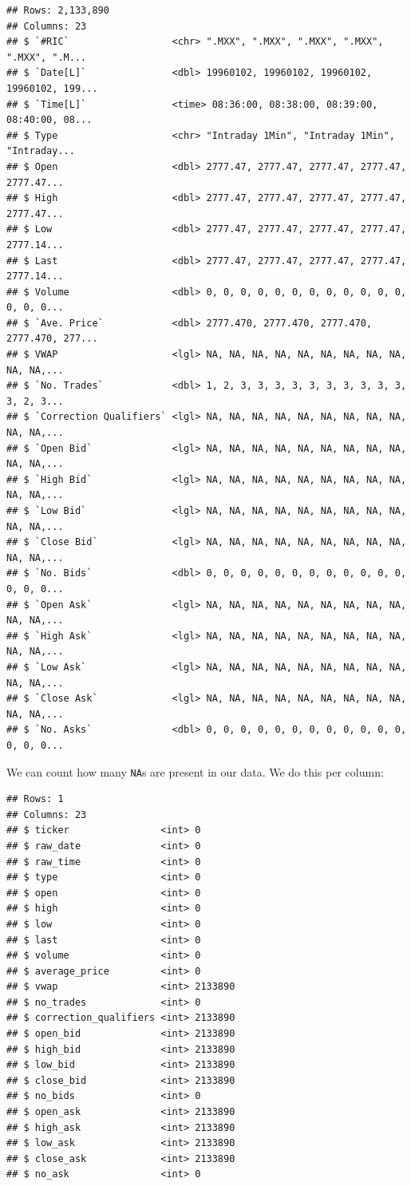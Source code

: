 \documentclass[]{elsarticle} %
\begin{document}
\begin{verbatim}
## Rows: 2,133,890
## Columns: 23
## $ `#RIC`                  <chr> ".MXX", ".MXX", ".MXX", ".MXX", ".MXX", ".M...
## $ `Date[L]`               <dbl> 19960102, 19960102, 19960102, 19960102, 199...
## $ `Time[L]`               <time> 08:36:00, 08:38:00, 08:39:00, 08:40:00, 08...
## $ Type                    <chr> "Intraday 1Min", "Intraday 1Min", "Intraday...
## $ Open                    <dbl> 2777.47, 2777.47, 2777.47, 2777.47, 2777.47...
## $ High                    <dbl> 2777.47, 2777.47, 2777.47, 2777.47, 2777.47...
## $ Low                     <dbl> 2777.47, 2777.47, 2777.47, 2777.47, 2777.14...
## $ Last                    <dbl> 2777.47, 2777.47, 2777.47, 2777.47, 2777.14...
## $ Volume                  <dbl> 0, 0, 0, 0, 0, 0, 0, 0, 0, 0, 0, 0, 0, 0, 0...
## $ `Ave. Price`            <dbl> 2777.470, 2777.470, 2777.470, 2777.470, 277...
## $ VWAP                    <lgl> NA, NA, NA, NA, NA, NA, NA, NA, NA, NA, NA,...
## $ `No. Trades`            <dbl> 1, 2, 3, 3, 3, 3, 3, 3, 3, 3, 3, 3, 3, 2, 3...
## $ `Correction Qualifiers` <lgl> NA, NA, NA, NA, NA, NA, NA, NA, NA, NA, NA,...
## $ `Open Bid`              <lgl> NA, NA, NA, NA, NA, NA, NA, NA, NA, NA, NA,...
## $ `High Bid`              <lgl> NA, NA, NA, NA, NA, NA, NA, NA, NA, NA, NA,...
## $ `Low Bid`               <lgl> NA, NA, NA, NA, NA, NA, NA, NA, NA, NA, NA,...
## $ `Close Bid`             <lgl> NA, NA, NA, NA, NA, NA, NA, NA, NA, NA, NA,...
## $ `No. Bids`              <dbl> 0, 0, 0, 0, 0, 0, 0, 0, 0, 0, 0, 0, 0, 0, 0...
## $ `Open Ask`              <lgl> NA, NA, NA, NA, NA, NA, NA, NA, NA, NA, NA,...
## $ `High Ask`              <lgl> NA, NA, NA, NA, NA, NA, NA, NA, NA, NA, NA,...
## $ `Low Ask`               <lgl> NA, NA, NA, NA, NA, NA, NA, NA, NA, NA, NA,...
## $ `Close Ask`             <lgl> NA, NA, NA, NA, NA, NA, NA, NA, NA, NA, NA,...
## $ `No. Asks`              <dbl> 0, 0, 0, 0, 0, 0, 0, 0, 0, 0, 0, 0, 0, 0, 0...
\end{verbatim}

We can count how many \texttt{NA}s are present in our data. We do this
per column:

\begin{verbatim}
## Rows: 1
## Columns: 23
## $ ticker                <int> 0
## $ raw_date              <int> 0
## $ raw_time              <int> 0
## $ type                  <int> 0
## $ open                  <int> 0
## $ high                  <int> 0
## $ low                   <int> 0
## $ last                  <int> 0
## $ volume                <int> 0
## $ average_price         <int> 0
## $ vwap                  <int> 2133890
## $ no_trades             <int> 0
## $ correction_qualifiers <int> 2133890
## $ open_bid              <int> 2133890
## $ high_bid              <int> 2133890
## $ low_bid               <int> 2133890
## $ close_bid             <int> 2133890
## $ no_bids               <int> 0
## $ open_ask              <int> 2133890
## $ high_ask              <int> 2133890
## $ low_ask               <int> 2133890
## $ close_ask             <int> 2133890
## $ no_ask                <int> 0
\end{verbatim}
\end{document}
